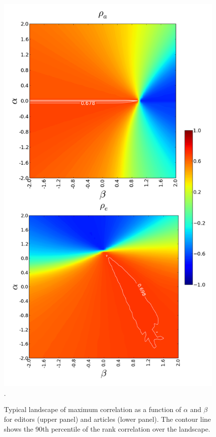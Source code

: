 \begin{figure}[!t]
\centering
\includegraphics[width=0.9\columnwidth]{Figures/contour_fem_combined.png}.
\caption{Typical landscape of maximum correlation as a function of $\alpha$ and $\beta$ for editors (upper panel) and articles (lower panel). The contour line shows the 90th percentile of the rank correlation over the landscape.}
\label{fig:landscape}
\end{figure}



